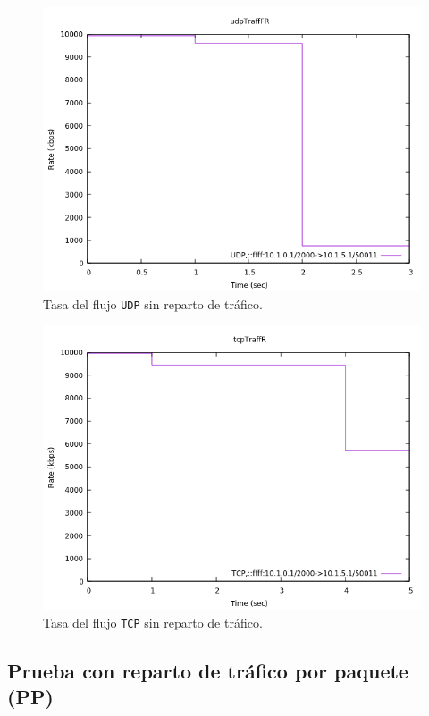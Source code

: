 \documentclass[11pt]{article}
\begin{document}
                \begin{figure}
                    \centering
                    \includegraphics[width=0.6\linewidth]{udpTraffNoBalancingR.png}
                    \caption{Tasa del flujo \texttt{UDP} sin reparto de tráfico.}
                    \label{fig:udpTraffNoBalancingR}
                \end{figure}

                \begin{figure}
                    \centering
                    \includegraphics[width=0.6\linewidth]{tcpTraffNoBalancingR.png}
                    \caption{Tasa del flujo \texttt{TCP} sin reparto de tráfico.}
                    \label{fig:tcpTraffNoBalancingR}
                \end{figure}

            \subsection{Prueba con reparto de tráfico por paquete (PP)}
                
\end{document}
